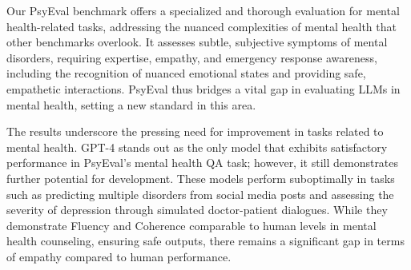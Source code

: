 Our PsyEval benchmark offers a specialized and thorough evaluation for mental health-related tasks, addressing the nuanced complexities of mental health that other benchmarks overlook. It assesses subtle, subjective symptoms of mental disorders, requiring expertise, empathy, and emergency response awareness, including the recognition of nuanced emotional states and providing safe, empathetic interactions. PsyEval thus bridges a vital gap in evaluating LLMs in mental health, setting a new standard in this area.

The results underscore the pressing need for improvement in tasks related to mental health. GPT-4 stands out as the only model that exhibits satisfactory performance in PsyEval's mental health QA task; however, it still demonstrates further potential for development. These models perform suboptimally in tasks such as predicting multiple disorders from social media posts and assessing the severity of depression through simulated doctor-patient dialogues. While they demonstrate Fluency and Coherence comparable to human levels in mental health counseling, ensuring safe outputs, there remains a significant gap in terms of empathy compared to human performance.